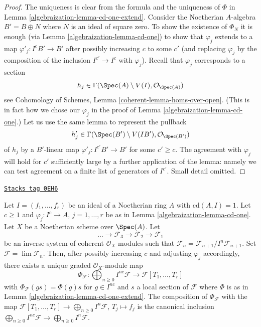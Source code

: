 \begin{proof}

The uniqueness is clear from the formula and the uniqueness of $\Phi$ in
Lemma \ref{algebraization-lemma-cd-one-extend}. Consider the Noetherian $A$-algebra
$B' = B \oplus N$ where $N$ is an ideal of square zero. To show
the existence of $\Phi_N$ it is enough
(via Lemma \ref{algebraization-lemma-cd-one}) to show that $\varphi_j$ extends to
a map $\varphi'_j : I^cB' \to B'$ after possibly increasing $c$
to some $c'$ (and replacing $\varphi_j$ by the composition of the inclusion
$I^{c'} \to I^c$ with $\varphi_j$). Recall that $\varphi_j$ corresponds to a
section
$$
h_j \in \Gamma(\Spec(A) \setminus V(I), \mathcal{O}_{\Spec(A)})
$$
see Cohomology of Schemes, Lemma \ref{coherent-lemma-homs-over-open}.
(This is in fact how we chose our $\varphi_j$ in the proof of
Lemma \ref{algebraization-lemma-cd-one}.) Let us use the same lemma to represent the pullback
$$
h'_j \in \Gamma(\Spec(B') \setminus V(IB'), \mathcal{O}_{\Spec(B')})
$$
of $h_j$ by a $B'$-linear map
$\varphi'_j : I^{c'}B' \to B'$ for some $c' \geq c$.
The agreement with $\varphi_j$ will hold for $c'$
sufficiently large by a further application of the lemma:
namely we can test agreement on a finite list of generators of $I^{c'}$.
Small detail omitted.
\end{proof}

\begin{lemma}
\label{algebraization-lemma-cd-is-one-for-system}
\href{https://stacks.math.columbia.edu/tag/0EH6}{\texttt{Stacks tag 0EH6}}

Let $I = (f_1, \ldots, f_r)$ be an ideal of a Noetherian ring $A$ with
$\text{cd}(A, I) = 1$. Let $c \geq 1$ and $\varphi_j : I^c \to A$,
$j = 1, \ldots, r$ be as in Lemma \ref{algebraization-lemma-cd-one}.
Let $X$ be a Noetherian scheme over $\Spec(A)$. Let
$$
\ldots \to \mathcal{F}_3 \to \mathcal{F}_2 \to \mathcal{F}_1
$$
be an inverse system of coherent $\mathcal{O}_X$-modules
such that $\mathcal{F}_n = \mathcal{F}_{n + 1}/I^n\mathcal{F}_{n + 1}$.
Set $\mathcal{F} = \lim \mathcal{F}_n$.
Then, after possibly increasing $c$ and adjusting $\varphi_j$ accordingly,
there exists a unique graded $\mathcal{O}_X$-module map
$$
\Phi_\mathcal{F} :
\bigoplus\nolimits_{n \geq 0} I^{nc}\mathcal{F}
\longrightarrow
\mathcal{F}[T_1, \ldots, T_r]
$$
with $\Phi_\mathcal{F}(g s) = \Phi(g) s$ for $g \in I^{nc}$ and
$s$ a local section of $\mathcal{F}$ where $\Phi$ is as in
Lemma \ref{algebraization-lemma-cd-one-extend}. The composition of $\Phi_\mathcal{F}$
with the map
$\mathcal{F}[T_1, \ldots, T_r] \to \bigoplus_{n \geq 0} I^n\mathcal{F}$,
$T_j \mapsto f_j$
is the canonical inclusion
$\bigoplus_{n \geq 0} I^{nc}\mathcal{F} \to
\bigoplus_{n \geq 0} I^n\mathcal{F}$.
\end{lemma}

